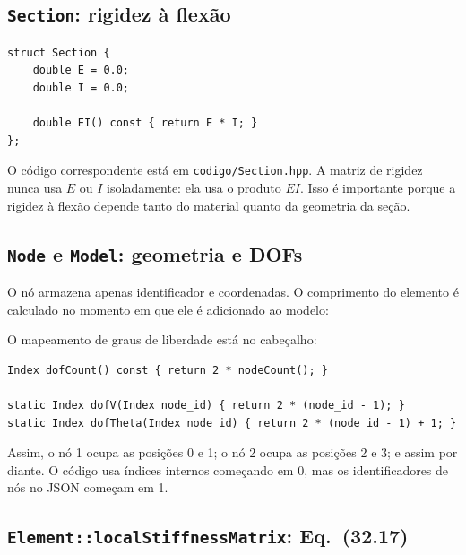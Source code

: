 \documentclass[12pt,a4paper]{article}
\begin{document}
\subsection{\texttt{Section}: rigidez à flexão}

\begin{lstlisting}[caption={\texttt{Section.hpp}: armazenamento de \(E\), \(I\) e cálculo de \(EI\).},label={lst:section}]
struct Section {
    double E = 0.0;
    double I = 0.0;

    double EI() const { return E * I; }
};
\end{lstlisting}

O código correspondente está em \texttt{codigo/Section.hpp}. A matriz de rigidez nunca usa \(E\) ou \(I\) isoladamente: ela usa o produto \(EI\). Isso é importante porque a rigidez à flexão depende tanto do material quanto da geometria da seção.

\subsection{\texttt{Node} e \texttt{Model}: geometria e DOFs}

O nó armazena apenas identificador e coordenadas. O comprimento do elemento é calculado no momento em que ele é adicionado ao modelo:



O mapeamento de graus de liberdade está no cabeçalho:

\begin{lstlisting}[caption={Mapeamento global de DOFs em \texttt{Model.hpp}.},label={lst:dofs}]
Index dofCount() const { return 2 * nodeCount(); }

static Index dofV(Index node_id) { return 2 * (node_id - 1); }
static Index dofTheta(Index node_id) { return 2 * (node_id - 1) + 1; }
\end{lstlisting}

Assim, o nó 1 ocupa as posições 0 e 1; o nó 2 ocupa as posições 2 e 3; e assim por diante. O código usa índices internos começando em 0, mas os identificadores de nós no JSON começam em 1.

\subsection{\texttt{Element::localStiffnessMatrix}: Eq.~(32.17)}
\end{document}
